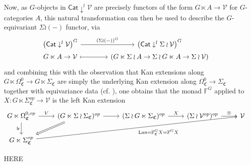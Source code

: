 \documentclass[a4paper,10pt
,draft
]{article}%
\numberwithin{equation}{section}
\numberwithin{figure}{section}
\theoremstyle{definition} %
\newcommand{\Cat}{\mathsf{Cat}}
\DeclareMathOperator{\Lan}{Lan}%
\newcommand{\V}{\ensuremath{\mathcal V}}
\newcommand{\1}{\ensuremath{\mathbbm 1}}%
\begin{document}
Now, as $G$-objects in $\Cat \downarrow^l \V$ are precisely functors of the form $G \ltimes A \to \V$ for $G$-categories $A$,
this natural transformation can then be used to describe the $G$-equivariant $\Sigma \wr (-)$ functor, via
\begin{equation}\label{RHOPURP EQ}
\begin{tikzcd}[column sep =40,row sep =0]
	\left( \mathsf{Cat} \downarrow^{l} \mathcal{V} \right)^G
	\ar{r}{\left(\Sigma \wr (-) \right)^G} &
	\left( \mathsf{Cat} \downarrow^{l} \Sigma \wr \mathcal{V} \right)^G
\\
        G \ltimes A \to \mathcal{V} \ar[mapsto]{r} &
	(G \ltimes \Sigma \wr A \to 
	\Sigma \wr G \ltimes  A \to \Sigma \wr \mathcal{V})
\end{tikzcd}
\end{equation}
and combining this with the observation that Kan extensions along
$G \ltimes \Omega_{\mathfrak{C}}^0 \to G \ltimes \Sigma_{\mathfrak{C}}$
are simply the underlying Kan extension along 
$\Omega_{\mathfrak{C}}^0 \to \Sigma_{\mathfrak{C}}$
together with equivariance data (cf. \cite[Lemma \ref{TAS-REDUCELAN_LEM}]{BP_TAS}), %
one obtains that the monad $\mathbb{F}^G$ applied to 
$X\colon G \ltimes \Sigma_{\mathfrak{C}}^{op} \to \mathcal{V}$
is the left Kan extension
\begin{equation}\label{FGC_EQ}
	\begin{tikzcd}
		G \ltimes \Omega^{0,op}_{\mathfrak{C}}
		\arrow[d, "\mathsf{lr}"']
		\arrow[r, "V"]
	&
		(G\ltimes \Sigma \wr \Sigma_{\mathfrak{C}})^{op} \arrow{r}
		\arrow[dl, Rightarrow]
	&
		(\Sigma \wr G\ltimes \Sigma_{\mathfrak{C}})^{op} \arrow[r, "X"]
	&
		(\Sigma \wr \V^{op})^{op} \arrow[r, "\otimes"]
	&
		\V
\\
	G\ltimes\Sigma^{op}_{\mathfrak{C}}
	\arrow[urrrr, "\Lan = \mathbb F_{\mathfrak{C}}^G X = \mathbb F^G X"']
	\end{tikzcd}
\end{equation}


{\color{red} HERE}
\end{document}
